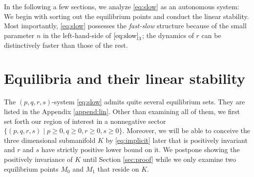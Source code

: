 \documentclass[a4paper,11pt]{article}
\theoremstyle{remark}
\begin{document}
In the following a few sections, we analyze \eqref{eq:slow} as an autonomous system: We begin with sorting out the equilibrium points and conduct the linear stability. Most importantly, \eqref{eq:slow} possesses the {\it fast-slow} structure because of the small parameter $n$ in the left-hand-side of $\eqref{eq:slow}_3$; the dynamics of $r$ can be distinctively faster than those of the rest.

\section{Equilibria and their linear stability} \label{sec:equil}
The $(p,q,r,s)$-system \eqref{eq:slow} admits quite several equilibrium sets. They are listed in the Appendix \ref{append:lin}. Other than examining all of them, we first set forth our region of interest in a nonnegative sector $\{(p,q,r,s) \; | \; p\ge0, q\ge0, r\ge0, s\ge0 \}$. Moreover, we will be able to conceive the three dimensional submanifold $K$ by \eqref{eq:implicit} later that is positively invariant and $r$ and $s$ have strictly positive lower bound on it. %
We postpone showing the positively invariance of $K$ until Section \ref{sec:proof} while we only examine two equilibrium points $M_0$ and $M_1$ that reside on $K$.
\end{document}
